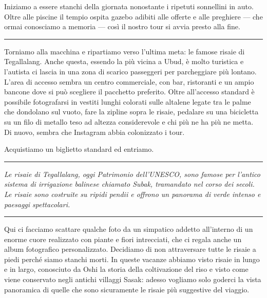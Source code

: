 Iniziamo a essere stanchi della giornata nonostante i ripetuti sonnellini in auto. Oltre alle piscine il tempio ospita gazebo adibiti alle offerte e alle preghiere — che ormai conosciamo a memoria — così il nostro tour si avvia presto alla fine.

\begin{center}
    \noindent\rule{0.6\textwidth}{0.4pt}
\end{center}

Torniamo alla macchina e ripartiamo verso l'ultima meta: le famose risaie di Tegallalang. Anche questa, essendo la più vicina a Ubud, è molto turistica e l'autista ci lascia in una zona di scarico passeggeri per parcheggiare più lontano. L'area di accesso sembra un centro commerciale, con bar, ristoranti e un ampio bancone dove si può scegliere il pacchetto preferito. Oltre all'accesso standard è possibile fotografarsi in vestiti lunghi colorati sulle altalene legate tra le palme che dondolano sul vuoto, fare la zipline sopra le risaie, pedalare su una bicicletta su un filo di metallo teso ad altezza considerevole e chi più ne ha più ne metta. Di nuovo, sembra che Instagram abbia colonizzato i tour.

Acquistiamo un biglietto standard ed entriamo.

\begin{center}
    \noindent\rule{0.6\textwidth}{0.4pt}
\end{center}

\textit{Le risaie di Tegallalang, oggi Patrimonio dell'UNESCO, sono famose per l'antico sistema di irrigazione balinese chiamato Subak, tramandato nel corso dei secoli. Le risaie sono costruite su ripidi pendii e offrono un panorama di verde intenso e paesaggi spettacolari.}

\begin{center}
    \noindent\rule{0.6\textwidth}{0.4pt}
\end{center}

Qui ci facciamo scattare qualche foto da un simpatico addetto all'interno di un enorme cuore realizzato con piante e fiori intrecciati, che ci regala anche un album fotografico personalizzato. Decidiamo di non attraversare tutte le risaie a piedi perché siamo stanchi morti. In queste vacanze abbiamo visto risaie in lungo e in largo, conosciuto da Oshi la storia della coltivazione del riso e visto come viene conservato negli antichi villaggi Sasak: adesso vogliamo solo goderci la vista panoramica di quelle che sono sicuramente le risaie più suggestive del viaggio.


